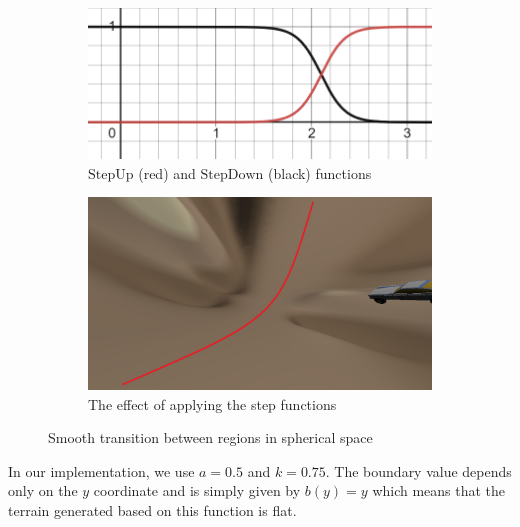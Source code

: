 \begin{figure}[h]
    \centering
    \begin{subfigure}[b]{0.475\textwidth}
        \centering
        \includegraphics[width=\textwidth]{chapters/problems/resources/step-functions.png}
        \caption[]%
        {{\small $\mathrm{StepUp}$ (red) and $\mathrm{StepDown}$ (black) functions}}
        \label{fig:step-functions}
    \end{subfigure}
    \hfill
    \begin{subfigure}[b]{0.475\textwidth}
        \centering
        \includegraphics[width=\textwidth]{chapters/problems/resources/boundary-flat.png}
        \caption[]%
        {{\small The effect of applying the step functions}}
        \label{fig:stiched-spheres}
    \end{subfigure}
    \caption[]
    {\small Smooth transition between regions in spherical space}
    \label{fig:stiching-spheres}
\end{figure}
In our implementation, we use $a = 0.5$ and $k = 0.75$.
The boundary value depends only on the $y$ coordinate and is simply given by $b(y) = y$ which means that the terrain generated based on this function is flat.